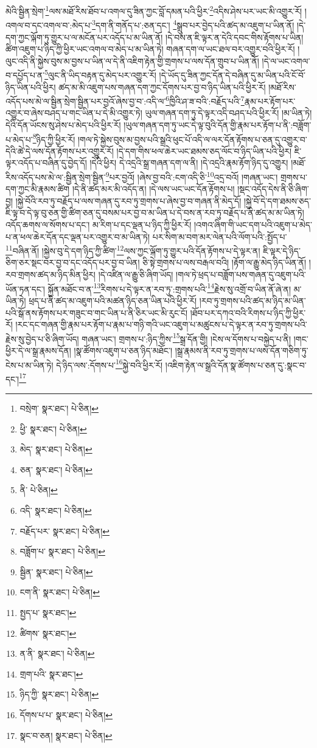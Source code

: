 མེའི་སྦྱིན་སྲེག་\footnote{བསྲེག་  སྣར་ཐང་།  པེ་ཅིན། }ལས་མཐོ་རིས་ཐོབ་པ་འགལ་དུ་ཟིན་ཀྱང་བློ་དམན་པའི་ཕྱིར་\footnote{ཕྱི་  སྣར་ཐང་།  པེ་ཅིན། }འདིས་ཤེས་པར་ཡང་མི་འགྱུར་རོ། །འགལ་བ་དང་འགལ་བ་:མེད་པ་\footnote{མེད་  སྣར་ཐང་།  པེ་ཅིན། }དག་ནི་གནོད་པ་:ཅན་དང་། \footnote{ཅན་  སྣར་ཐང་།  པེ་ཅིན། }སྒྲུབ་པར་བྱེད་པའི་ཚད་མ་འཇུག་པ་ཡིན་ནོ། །དེ་དག་ཀྱང་ལྐོག་ཏུ་གྱུར་པ་ལ་མངོན་པར་འདོད་པ་མ་ཡིན་ནོ། །དེ་བས་ན་ཇི་ལྟར་ན་དེའི་དབང་གིས་རྟོགས་པ་ཡིན། ཚིག་འཇུག་པ་ཉིད་ཀྱི་ཕྱིར་ཡང་འགལ་བ་མེད་པ་མ་ཡིན་ཏེ། གཞན་དག་ལ་ཡང་ཐལ་བར་འགྱུར་བའི་ཕྱིར་རོ། །ལུང་འདི་ནི་སྐྱེས་བུས་མ་བྱས་པ་ཡིན་ལ་དེ་ནི་འཇིག་རྟེན་གྱི་གྲགས་པ་ལས་དོན་གྲུབ་པ་ཡིན་ནོ། །དེ་ལ་ཡང་འགལ་བ་དཔྱོད་པ་ན་\footnote{ནི་  པེ་ཅིན། }ལུང་ནི་ཡིད་བརྟན་དུ་མེད་པར་འགྱུར་རོ། །དེ་ཡོད་དུ་ཟིན་ཀྱང་དོན་དེ་བཞིན་དུ་མ་ཡིན་པའི་ངོ་བོ་ཉིད་ཡིན་པའི་ཕྱིར། ཚད་མ་མི་འཇུག་པས་གཞན་དག་ཀྱང་དོགས་པར་བྱ་བ་ཉིད་ཡིན་པའི་ཕྱིར་རོ། །མཐོ་རིས་འདོད་པས་མེ་ལ་སྦྱིན་སྲེག་སྦྱིན་པར་བྱའོ་ཞེས་བྱ་བ་:འདི་ལ་\footnote{འདི་  སྣར་ཐང་།  པེ་ཅིན། }ཁྱིའི་ཤ་ཟ་བའི་:བརྗོད་པའི་\footnote{བརྗོད་པར་  སྣར་ཐང་།  པེ་ཅིན། }རྣམ་པར་རྟོག་པར་འགྱུར་བ་ཞེས་བཤད་པ་གང་ཡིན་པ་དེ་མི་འགྱུར་ཏེ། ཡུལ་གཞན་དག་ཏུ་དེ་ལྟར་འདི་བཤད་པའི་ཕྱིར་རོ། །མ་ཡིན་ཏེ། དེའི་དོན་ཡོངས་སུ་ཤེས་པ་མེད་པའི་ཕྱིར་རོ། །ཡུལ་གཞན་དག་ཏུ་ཡང་དེ་ལྟ་བུའི་དོན་གྱི་རྣམ་པར་རྟོག་པ་ནི་:བཟློག་པ་མེད་པ་\footnote{བཟློག་པ་  སྣར་ཐང་།  པེ་ཅིན། }ཉིད་ཀྱི་ཕྱིར་རོ། །གལ་ཏེ་སྐྱེས་བུས་མ་བྱས་པའི་སྒྲའི་ཕུང་པོ་འདི་ལ་ལར་དོན་རྟོགས་པ་ཅན་དུ་འགྱུར་བ་དེའི་ཚེ་དེ་ལས་དོན་རྟོགས་པར་འགྱུར་རོ། །དེ་དག་གིས་ཕལ་ཆེར་ཡང་ཐམས་ཅད་ལོང་བ་ཉིད་ཡིན་པའི་ཕྱིར། ཇི་ལྟར་འདོད་པ་བཞིན་དུ་བྱེད་དོ། །དེའི་ཕྱིར། དེ་འདྲའི་སྒྲ་གཞན་དག་ལ་ནི། །དེ་འདྲའི་རྣམ་རྟོག་ཉིད་དུ་འགྱུར། །མཐོ་རིས་འདོད་པས་མེ་ལ་:སྦྱིན་སྲེག་སྦྱིན་\footnote{སྦྱིན་  སྣར་ཐང་།  པེ་ཅིན། }པར་བྱའོ། །ཞེས་བྱ་བའི་:ངག་འདི་ཅི་\footnote{ངག་ནི་  སྣར་ཐང་།  པེ་ཅིན། }འདྲ་བའོ། །གཞན་ཡང་། གྲགས་པ་དག་ཀྱང་མི་རྣམས་ཚིག །དེ་ནི་ཚད་མར་མི་འདོད་ན། །དེ་ལས་ཡང་ཡང་དོན་རྟོགས་པ། །སྡང་འདོད་དེས་ནི་ཅི་ཞིག་བྱ། །སྐྱེ་བོའི་རབ་ཏུ་བརྗོད་པ་ལས་གཞན་དུ་རབ་ཏུ་གྲགས་པ་ཞེས་བྱ་བ་གཞན་ནི་མེད་དོ། །སྐྱེ་བོ་དེ་དག་ཐམས་ཅད་ཇི་ལྟ་བ་དེ་ལྟ་བུ་ཅན་གྱི་ཚིག་ཅན་དུ་བསམ་པར་བྱ་བ་མ་ཡིན་པ་དེ་བས་ན་རབ་ཏུ་བརྗོད་པ་ནི་ཚད་མ་མ་ཡིན་ཏེ། འདོད་ཆགས་ལ་སོགས་པ་དང་། མ་རིག་པ་དང་ལྡན་པ་ཉིད་ཀྱི་ཕྱིར་རོ། །འགའ་ཞིག་གི་ཡང་དག་པའི་འཇུག་པ་མེད་པ་ན་ཕལ་ཆེར་དོན་དང་ལྡན་པར་འགྱུར་བ་མ་ཡིན་ཏེ། པར་སིག་མ་བག་མར་ལེན་པའི་ལོག་པའི་:སྤྱོད་པ་\footnote{སྤྱད་པ་  སྣར་ཐང་། }བཞིན་ནོ། །སྐྱེས་བུ་དེ་དག་ཉིད་ཀྱི་ཚིག་\footnote{ཚིགས་  སྣར་ཐང་། }ལས་ཀྱང་ལྐོག་ཏུ་གྱུར་པའི་དོན་རྟོགས་པ་དེ་ལྟར་ན། ཇི་ལྟར་དེ་ཉིད་ཅིག་ཅར་སྡང་བར་བྱ་བ་དང་འདོད་པར་བྱ་བ་ཡིན། ཅི་སྟེ་གྲགས་པ་ལས་བརྒལ་བའི། །རྟོག་ལ་རྒྱུ་མེད་ཉིད་ཡིན་ནོ། །རབ་གྲགས་ཚད་མ་ཉིད་མིན་ཕྱིར། །དེ་འཛིན་ལ་རྒྱུ་ཅི་ཞིག་ཡོད། །གལ་ཏེ་ཕྲད་པ་བཟློག་པས་གཞན་དུ་འཇུག་པའི་ཡོན་ཏན་དང་། སྐྱོན་མཐོང་བ་ན་\footnote{ན་ནི་  སྣར་ཐང་།  པེ་ཅིན། }རིགས་པ་དེ་ལྟར་ན་རབ་ཏུ་:གྲགས་པའི་\footnote{གྲག་པའི་  སྣར་ཐང་། }རྗེས་སུ་འགྲོ་བ་ཡིན་ནོ་ཞེ་ན། མ་ཡིན་ཏེ། ཕྲད་པ་ནི་ཚད་མ་འཇུག་པའི་མཚན་ཉིད་ཅན་ཡིན་པའི་ཕྱིར་རོ། །རབ་ཏུ་གྲགས་པའི་ཚད་མ་ཉིད་མ་ཡིན་པའི་སྒོ་ནས་རྟོགས་པར་གཟུང་བ་གང་ཡིན་པ་ནི་ཅིར་ཡང་མི་རུང་ངོ། །ཐོབ་པར་དཀའ་བའི་རིགས་པ་ཉིད་ཀྱི་ཕྱིར་རོ། །རང་དང་གཞན་གྱི་རྣམ་པར་རྟོག་པ་རྣམ་པ་གཉི་གའི་ཡང་འཇུག་པ་མཚུངས་པ་དེ་ལྟར་ན་རབ་ཏུ་གྲགས་པའི་རྗེས་སུ་བྱེད་པ་ཅི་ཞིག་ཡོད། གཞན་ཡང་། གྲགས་པ་:ཉིད་ཀྱིས་\footnote{ཉིད་ཀྱི་  སྣར་ཐང་།  པེ་ཅིན། }སྒྲ་དོན་གྱི། །ངེས་ལ་དོགས་པ་བསྐྱེད་པ་ནི། །གང་ཕྱིར་དེ་ལ་སྒྲ་རྣམས་དོན། །སྣ་ཚོགས་འཇུག་པ་ཅན་ཉིད་མཐོང་། །སྒྲ་རྣམས་ནི་རབ་ཏུ་གྲགས་པ་ལས་དོན་གཅིག་ཏུ་ངེས་པ་མ་ཡིན་ཏེ། དེ་ཉིད་ལས་:དོགས་པ་\footnote{དོགས་པ་པ་  སྣར་ཐང་།  པེ་ཅིན། }སྐྱེ་བའི་ཕྱིར་རོ། །འཇིག་རྟེན་ལ་སྒྲའི་དོན་སྣ་ཚོགས་པ་ཅན་དུ་:སྣང་བ་དང་།\footnote{སྣང་བ་ཅན།  སྣར་ཐང་།  པེ་ཅིན། } 
